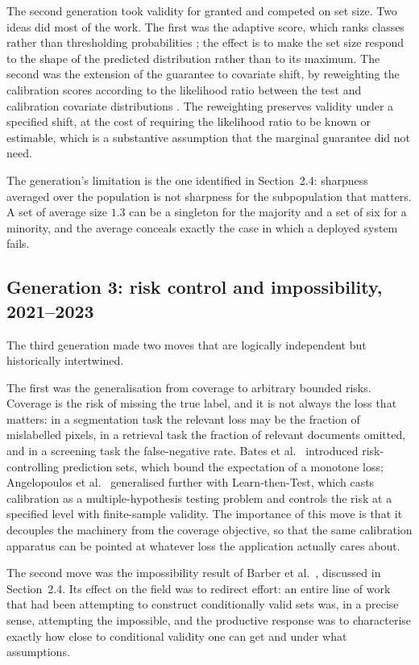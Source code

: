 \documentclass[a4paper,longmktitle]{cas-sc}
\begin{document}
The second generation took validity for granted and competed on set size. Two ideas did most of the work. The first was the adaptive score, which ranks classes rather than thresholding probabilities \cite{Romano2020,RAPS}; the effect is to make the set size respond to the shape of the predicted distribution rather than to its maximum. The second was the extension of the guarantee to covariate shift, by reweighting the calibration scores according to the likelihood ratio between the test and calibration covariate distributions \cite{Tibshirani2019}. The reweighting preserves validity under a specified shift, at the cost of requiring the likelihood ratio to be known or estimable, which is a substantive assumption that the marginal guarantee did not need.

The generation's limitation is the one identified in Section~2.4: sharpness averaged over the population is not sharpness for the subpopulation that matters. A set of average size $1.3$ can be a singleton for the majority and a set of six for a minority, and the average conceals exactly the case in which a deployed system fails.

\subsection{Generation 3: risk control and impossibility, 2021--2023}

The third generation made two moves that are logically independent but historically intertwined.

The first was the generalisation from coverage to arbitrary bounded risks. Coverage is the risk of missing the true label, and it is not always the loss that matters: in a segmentation task the relevant loss may be the fraction of mislabelled pixels, in a retrieval task the fraction of relevant documents omitted, and in a screening task the false-negative rate. Bates et al.\ \cite{Bates2021} introduced risk-controlling prediction sets, which bound the expectation of a monotone loss; Angelopoulos et al.\ \cite{LTT} generalised further with Learn-then-Test, which casts calibration as a multiple-hypothesis testing problem and controls the risk at a specified level with finite-sample validity. The importance of this move is that it decouples the machinery from the coverage objective, so that the same calibration apparatus can be pointed at whatever loss the application actually cares about.

The second move was the impossibility result of Barber et al.\ \cite{Barber2021}, discussed in Section~2.4. Its effect on the field was to redirect effort: an entire line of work that had been attempting to construct conditionally valid sets was, in a precise sense, attempting the impossible, and the productive response was to characterise exactly how close to conditional validity one can get and under what assumptions.
\end{document}
